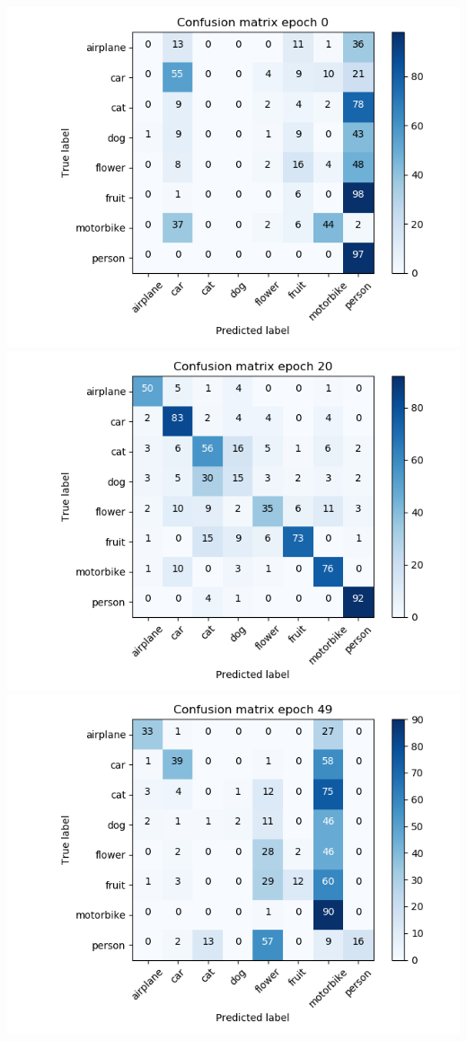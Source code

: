 \documentclass{article}
\begin{document}
\begin{minipage}[c]{\linewidth}
	\includegraphics[width=\figureWidth\textwidth]{./figures/cm_h32_w32_cp_none_e0.png}
	\includegraphics[width= \figureWidth\textwidth]{./figures/cm_h32_w32_cp_none_e20.png}
	\includegraphics[width= \figureWidth\textwidth]{./figures/cm_h32_w32_cp_none_e49.png}
	

\end{minipage}
\end{document}
